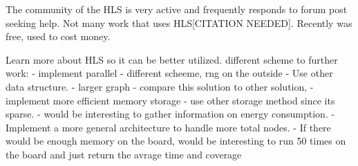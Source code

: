 The community of the HLS is very active and frequently responds to forum post seeking help.	Not many work that uses HLS[CITATION NEEDED]. Recently was free, used to cost money.


Learn more about HLS so it can be better utilized. 
different scheme to further work:
- implement parallel
- different scheeme, rng on the outside
- Use other data structure.
- larger graph
- compare this solution to other solution, 
- implement more efficient memory storage
- use other storage method since its sparse. 
- would be interesting to gather information on  energy consumption.
- Implement a more general architecture to handle more total nodes.
- If  there would be enough memory on the board, would be interesting to run 50 times on the board and just return the avrage time and coverage
